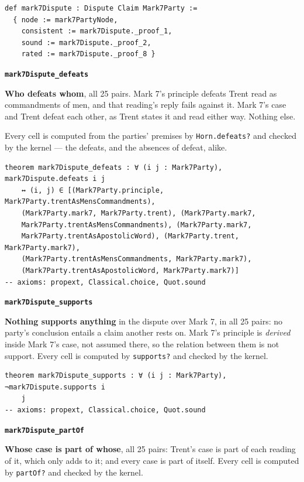 \documentclass[11pt]{article}
\begin{document}
{\small\begin{verbatim}
def mark7Dispute : Dispute Claim Mark7Party :=
  { node := mark7PartyNode,
    consistent := mark7Dispute._proof_1,
    sound := mark7Dispute._proof_2,
    rated := mark7Dispute._proof_8 }
\end{verbatim}}
\par\medskip\noindent\textbf{\texttt{mark7\allowbreak{}Dispute\_\allowbreak{}defeats}}\par\nobreak\noindent
\textbf{Who defeats whom}, all 25 pairs. Mark 7’s principle defeats Trent read as commandments of men, and that reading’s reply fails against it. Mark 7’s case and Trent defeat each other, as Trent states it and read either way. Nothing else.

Every cell is computed from the parties’ premises by \texttt{Horn.defeats?} and checked by the kernel — the defeats, and the absences of defeat, alike.

{\small\begin{verbatim}
theorem mark7Dispute_defeats : ∀ (i j : Mark7Party), mark7Dispute.defeats i j
    ↔ (i, j) ∈ [(Mark7Party.principle, Mark7Party.trentAsMensCommandments),
    (Mark7Party.mark7, Mark7Party.trent), (Mark7Party.mark7,
    Mark7Party.trentAsMensCommandments), (Mark7Party.mark7,
    Mark7Party.trentAsApostolicWord), (Mark7Party.trent, Mark7Party.mark7),
    (Mark7Party.trentAsMensCommandments, Mark7Party.mark7),
    (Mark7Party.trentAsApostolicWord, Mark7Party.mark7)]
-- axioms: propext, Classical.choice, Quot.sound
\end{verbatim}}
\par\medskip\noindent\textbf{\texttt{mark7\allowbreak{}Dispute\_\allowbreak{}supports}}\par\nobreak\noindent
\textbf{Nothing supports anything} in the dispute over Mark 7, in all 25 pairs: no party’s conclusion entails a claim another rests on. Mark 7’s principle is \emph{derived} inside Mark 7’s case, not assumed there, so the relation between them is not support. Every cell is computed by \texttt{supports?} and checked by the kernel.

{\small\begin{verbatim}
theorem mark7Dispute_supports : ∀ (i j : Mark7Party), ¬mark7Dispute.supports i
    j
-- axioms: propext, Classical.choice, Quot.sound
\end{verbatim}}
\par\medskip\noindent\textbf{\texttt{mark7\allowbreak{}Dispute\_\allowbreak{}part\allowbreak{}Of}}\par\nobreak\noindent
\textbf{Whose case is part of whose}, all 25 pairs: Trent’s case is part of each reading of it, which only adds to it; and every case is part of itself. Every cell is computed by \texttt{part\allowbreak{}Of?} and checked by the kernel.
\end{document}
